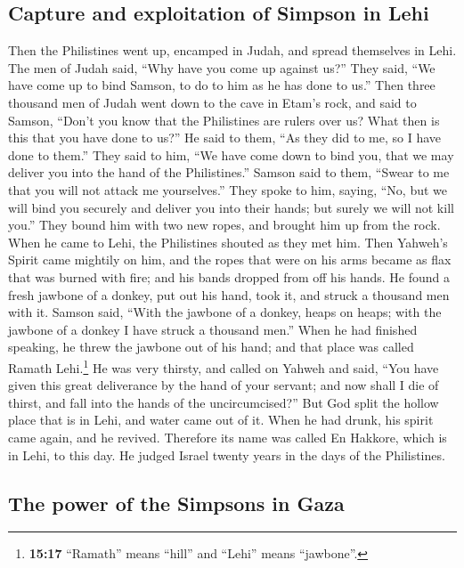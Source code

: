\hypertarget{capture-and-exploitation-of-simpson-in-lehi}{%
\subsection{Capture and exploitation of Simpson in
Lehi}\label{capture-and-exploitation-of-simpson-in-lehi}}

 Then the Philistines went up, encamped in Judah, and
spread themselves in Lehi.  The men of Judah said, ``Why
have you come up against us?'' They said, ``We have come up to bind
Samson, to do to him as he has done to us.''  Then three
thousand men of Judah went down to the cave in Etam's rock, and said to
Samson, ``Don't you know that the Philistines are rulers over us? What
then is this that you have done to us?'' He said to them, ``As they did
to me, so I have done to them.''  They said to him, ``We
have come down to bind you, that we may deliver you into the hand of the
Philistines.'' Samson said to them, ``Swear to me that you will not
attack me yourselves.''  They spoke to him, saying, ``No,
but we will bind you securely and deliver you into their hands; but
surely we will not kill you.'' They bound him with two new ropes, and
brought him up from the rock.  When he came to Lehi, the
Philistines shouted as they met him. Then Yahweh's Spirit came mightily
on him, and the ropes that were on his arms became as flax that was
burned with fire; and his bands dropped from off his hands.
 He found a fresh jawbone of a donkey, put out his hand,
took it, and struck a thousand men with it.  Samson said,
``With the jawbone of a donkey, heaps on heaps; with the jawbone of a
donkey I have struck a thousand men.''  When he had
finished speaking, he threw the jawbone out of his hand; and that place
was called Ramath Lehi.\footnote{\textbf{15:17} ``Ramath'' means
  ``hill'' and ``Lehi'' means ``jawbone''.}  He was very
thirsty, and called on Yahweh and said, ``You have given this great
deliverance by the hand of your servant; and now shall I die of thirst,
and fall into the hands of the uncircumcised?''  But God
split the hollow place that is in Lehi, and water came out of it. When
he had drunk, his spirit came again, and he revived. Therefore its name
was called En Hakkore, which is in Lehi, to this day.  He
judged Israel twenty years in the days of the Philistines.

\hypertarget{the-power-of-the-simpsons-in-gaza}{%
\subsection{The power of the Simpsons in
Gaza}\label{the-power-of-the-simpsons-in-gaza}}

